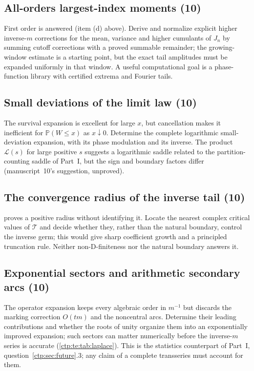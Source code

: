 \documentclass[11pt,a4paper]{article}
\numberwithin{equation}{section}
\theoremstyle{definition}
\theoremstyle{remark}
\newcommand{\PP}{\mathbb P}
\newcommand{\LW}{\mathcal L}
\begin{document}
\subsection{All-orders largest-index moments (10)}
First order is answered (item (d) above). Derive and normalize explicit
higher inverse-$m$ corrections for the mean, variance and higher cumulants
of $J_n$ by summing cutoff corrections with a proved summable remainder; the
growing-window estimate is a starting point, but the exact tail amplitudes
must be expanded uniformly in that window. A useful computational goal is a
phase-function library with certified extrema and Fourier tails.

\subsection{Small deviations of the limit law (10)}
The survival expansion is excellent for large $x$, but cancellation makes it
inefficient for $\PP(W\le x)$ as $x\downarrow0$. Determine the complete
logarithmic small-deviation expansion, with its phase modulation and its
inverse. The product $\LW(s)$ for large positive $s$ suggests a logarithmic
saddle related to the partition-counting saddle of Part~I, but the sign and
boundary factors differ (manuscript~10's suggestion, unproved).

\subsection{The convergence radius of the inverse tail (10)}
 proves a positive radius without identifying it.
Locate the nearest complex critical values of $\mathcal T$ and decide whether
they, rather than the natural boundary, control the inverse germ; this would
give sharp coefficient growth and a principled truncation rule. Neither
non-D-finiteness nor the natural boundary answers it.

\subsection{Exponential sectors and arithmetic secondary arcs (10)}
The operator expansion keeps every algebraic order in $m^{-1}$ but discards
the marking correction $O(tm)$ and the noncentral arcs. Determine their
leading contributions and whether the roots of unity organize them into an
exponentially improved expansion; such sectors can matter numerically before
the inverse-$m$ series is accurate (\cref{ctp:te:tab:laplace}). This is the
statistics counterpart of Part~I, question~\ref{ctp:sec:future}.3; any claim
of a complete transseries must account for them.
\end{document}
